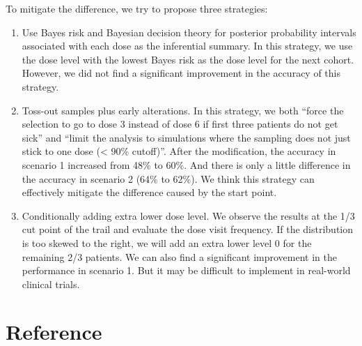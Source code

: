 \documentclass[
]{article}
\begin{document}
To mitigate the difference, we try to propose three strategies:

\begin{enumerate}
\def\labelenumi{\alph{enumi}.}
\item
  Use Bayes risk and Bayesian decision theory for posterior probability
  intervals associated with each dose as the inferential summary. In
  this strategy, we use the dose level with the lowest Bayes risk as the
  dose level for the next cohort. However, we did not find a significant
  improvement in the accuracy of this strategy.
\item
  Toss-out samples plus early alterations. In this strategy, we both
  ``force the selection to go to dose 3 instead of dose 6 if first three
  patients do not get sick'' and ``limit the analysis to simulations
  where the sampling does not just stick to one dose (\textless{} 90\%
  cutoff)''. After the modification, the accuracy in scenario 1
  increased from 48\% to 60\%. And there is only a little difference in
  the accuracy in scenario 2 (64\% to 62\%). We think this strategy can
  effectively mitigate the difference caused by the start point.
\item
  Conditionally adding extra lower dose level. We observe the results at
  the 1/3 cut point of the trail and evaluate the dose visit frequency.
  If the distribution is too skewed to the right, we will add an extra
  lower level 0 for the remaining 2/3 patients. We can also find a
  significant improvement in the performance in scenario 1. But it may
  be difficult to implement in real-world clinical trials.
\end{enumerate}

\hypertarget{reference}{%
\section*{Reference}\label{reference}}
\end{document}

